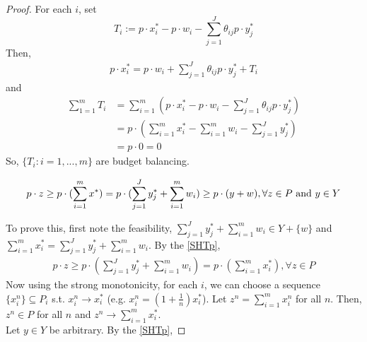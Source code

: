 \documentclass[11pt]{elegantbook}
\begin{document}
\begin{proof}
    For each $i$, set $$T_i:=p\cdot x_i^*-p\cdot w_i-\sum_{j=1}^J\theta_{ij}p\cdot y_j^*$$
    Then,
    \begin{equation}
        \begin{aligned}
            p\cdot x_i^*=p\cdot w_i+\sum_{j=1}^J\theta_{ij}p\cdot y_j^*+T_i
        \end{aligned}
        \nonumber
    \end{equation}
    and
    \begin{equation}
        \begin{aligned}
            \sum_{1=1}^m T_i&=\sum_{i=1}^m \left(p\cdot x_i^*-p\cdot w_i-\sum_{j=1}^J\theta_{ij}p\cdot y_j^*\right)\\
            &=p\cdot \left(\sum_{i=1}^m x_i^*-\sum_{i=1}^m w_i-\sum_{j=1}^J y_j^*\right)\\
            &=p\cdot 0=0
        \end{aligned}
        \nonumber
    \end{equation}
    So, $\{T_i:i=1,...,m\}$ are budget balancing.
    \begin{claim}\label{C1}
        \begin{equation}
            \begin{aligned}
                p\cdot z\geq p\cdot (\sum_{i=1}^m x^*)=p\cdot (\sum_{j=1}^J y_j^*+\sum_{i=1}^m w_i)\geq p\cdot(y+w), \forall z\in P \textnormal{ and } y\in Y
            \end{aligned}
            \nonumber
        \end{equation}
    \end{claim}
    To prove this, first note the feasibility, $\sum_{j=1}^J y_j^*+\sum_{i=1}^m w_i\in Y+\{w\}$ and $\sum_{i=1}^m x_i^*=\sum_{j=1}^J y_j^*+\sum_{i=1}^m w_i$. By the \ref{SHTp},
    \begin{equation}
        \begin{aligned}
            p\cdot z\geq p\cdot\left(\sum_{j=1}^J y_j^*+\sum_{i=1}^m w_i\right)=p\cdot \left(\sum_{i=1}^mx_i^*\right), \forall z\in P
        \end{aligned}
        \nonumber
    \end{equation}
    Now using the strong monotonicity, for each $i$, we can choose a sequence $\{x_i^n\}\subseteq P_i$ s.t. $x_i^n \rightarrow x_i^*$ (e.g. $x_i^n=\left(1+\frac{1}{n}\right)x_i^*$). Let $z^n=\sum_{i=1}^m x_i^n$ for all $n$. Then, $z^n \in P$ for all $n$ and $z^n \rightarrow \sum_{i=1}^m x_i^*$.\\
    Let $y\in Y$ be arbitrary. By the \ref{SHTp},

\end{proof}
\end{document}
